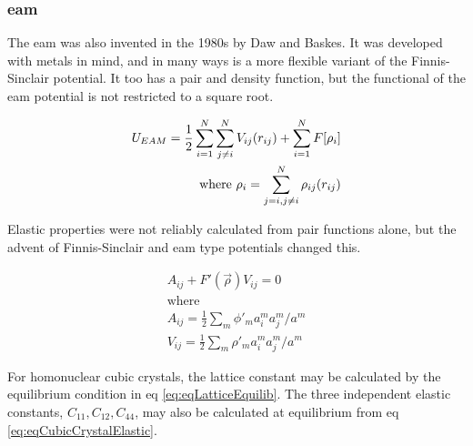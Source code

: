 \subsubsection{\Acrlong{eam}}
\label{section:EAM}

The \acrlong{eam} was also invented in the 1980s by Daw and Baskes.  It was developed with metals in mind, and in many ways is a more flexible variant of the Finnis-Sinclair potential.  It too has a pair and density function, but the functional of the \acrshort{eam} potential is not restricted to a square root.

\begin{equation}
\begin{split}
U_{EAM} = \frac{1}{2} \sum \limits_{i=1}^{N} \sum \limits_{j\ne i}^{N} V_{ij}(r_{ij}) + \sum \limits_{i=1}^{N} F[\rho _{i}] \\
\textnormal{where   } \rho_{i} = \sum \limits_{j=i,j \ne i}^{N} \rho_{ij}(r_{ij})
\end{split}
\label{eq:eqEAM}
\end{equation}

Elastic properties were not reliably calculated from pair functions alone\cite{dawbaskeseam}, but the advent of Finnis-Sinclair and \acrshort{eam} type potentials changed this.  

\begin{equation}
\begin{split}
A_{ij} + F'(\vec{\rho}) V_{ij} = 0 \\
\text{where} \\
A_{ij} = \frac{1}{2} \sum_{m} \phi'_m a_i^m a_j^m / a^m \\
V_{ij} = \frac{1}{2} \sum_{m} \rho'_m a_i^m a_j^m / a^m 
\end{split}
\label{eq:eqLatticeEquilib}
\end{equation}

For homonuclear cubic crystals, the lattice constant may be calculated by the equilibrium condition in eq \ref{eq:eqLatticeEquilib}.  The three independent elastic constants, $C_{11}, C_{12}, C_{44}$, may also be calculated at equilibrium from eq \ref{eq:eqCubicCrystalElastic}.  

